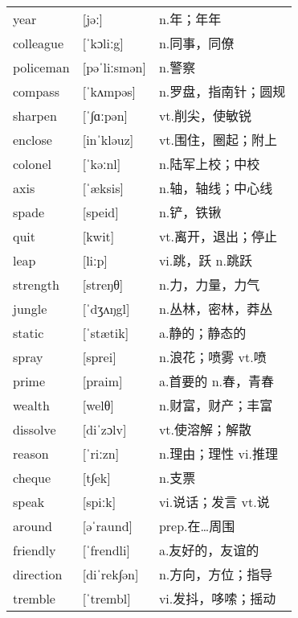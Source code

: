 \documentclass[a4paper]{article}
\begin{document}
\section{}
\begin{tabular}{l l l}

year & [jəː] & n.年；年年 \\
colleague & [ˈkɔliːg] & n.同事，同僚 \\
policeman & [pəˈliːsmən] & n.警察 \\
compass & [ˈkʌmpəs] & n.罗盘，指南针；圆规 \\
sharpen & [ˈ∫ɑːpən] & vt.削尖，使敏锐 \\
enclose & [inˈkləuz] & vt.围住，圈起；附上 \\
colonel & [ˈkəːnl] & n.陆军上校；中校 \\
axis & [ˈæksis] & n.轴，轴线；中心线 \\
spade & [speid] & n.铲，铁锹 \\
quit & [kwit] & vt.离开，退出；停止 \\
leap & [liːp] & vi.跳，跃 n.跳跃 \\
strength & [streŋθ] & n.力，力量，力气 \\
jungle & [ˈdʒʌŋgl] & n.丛林，密林，莽丛 \\
static & [ˈstætik] & a.静的；静态的 \\
spray & [sprei] & n.浪花；喷雾 vt.喷 \\
prime & [praim] & a.首要的 n.春，青春 \\
wealth & [welθ] & n.财富，财产；丰富 \\
dissolve & [diˈzɔlv] & vt.使溶解；解散 \\
reason & [ˈriːzn] & n.理由；理性 vi.推理 \\
cheque & [t∫ek] & n.支票 \\
speak & [spiːk] & vi.说话；发言 vt.说 \\
around & [əˈraund] & prep.在…周围 \\
friendly & [ˈfrendli] & a.友好的，友谊的 \\
direction & [diˈrek∫ən] & n.方向，方位；指导 \\
tremble & [ˈtrembl] & vi.发抖，哆嗦；摇动 \\

\end{tabular}
\end{document}
